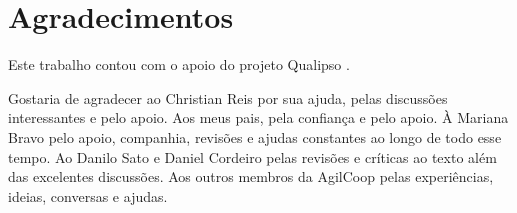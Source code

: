 \documentclass[11pt,twoside,a4paper]{book}
\begin{document}
%
%
%
%
%	
%	  


\chapter*{Agradecimentos}

Este trabalho contou com o apoio do projeto Qualipso \cite{Qualipso}.

Gostaria de agradecer ao Christian Reis por sua ajuda, pelas
discussões interessantes e pelo apoio. Aos meus pais, pela confiança e
pelo apoio. À Mariana Bravo pelo apoio, companhia, revisões e ajudas
constantes ao longo de todo esse tempo. Ao Danilo Sato e Daniel
Cordeiro pelas revisões e críticas ao texto além das excelentes
discussões. Aos outros membros da AgilCoop pelas experiências, ideias,
conversas e ajudas.
\end{document}
